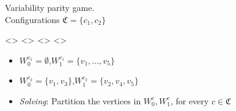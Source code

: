 \documentclass[aspectratio=169]{beamer}
\newcounter{picite}
\begin{document}
\begin{frame}[t]
\begin{columns}[t]
	\begin{column}{0.5\textwidth}
		\large Variability parity game.\small\\
		Configurations $\mathfrak{C} = \{c_1,c_2\}$\\
		\begin{center}
			\def\showprio{1}%
			\def\token{-1}%
			\def\playconf{0}%
			\only<\thepicite>{}%
			\def\playconf{1}%
			\only<\thepicite>{}%
			\def\playconf{2}%
			\only<\thepicite>{}%
			\def\playconf{0}%
			\only<\thepicite>{}%
		\end{center}
		\begin{itemize}\pause
			\item $W_0^{c_1} = \emptyset$,$W_1^{c_1} = \{v_1,\dots,v_5\}$\pause
			\item $W_0^{c_2} = \{v_1,v_3\}$,$W_1^{c_2} = \{v_2,v_4,v_5\}$\pause
			\item \textit{Solving}: Partition the vertices in $W_0^c,W_1^c$, for every $c \in \mathfrak{C}$
		\end{itemize}
	\end{column}
\end{columns}
\end{frame}
\end{document}

